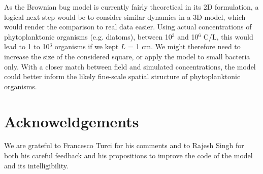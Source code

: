 As the Brownian bug model is currently fairly theoretical in its 2D formulation, a logical next step would be to consider similar dynamics in a 3D-model, which would render the comparison to real data easier. Using actual concentrations of phytoplanktonic organisms (e.g. diatoms), between 10$^3$ and 10$^6$ C/L, this would lead to 1 to 10$^3$ organisms if we kept $L$ = 1 cm. We might therefore need to increase the size of the considered square, or apply the model to small bacteria only. With a closer match between field and simulated concentrations, the model could better inform the likely fine-scale spatial structure of phytoplanktonic organisms. 

{\color{blue}
\section*{Acknoweldgements}
We are grateful to Francesco Turci for his comments and to Rajesh Singh for both his careful feedback and his propositions to improve the code of the model and its intelligibility. 

}



